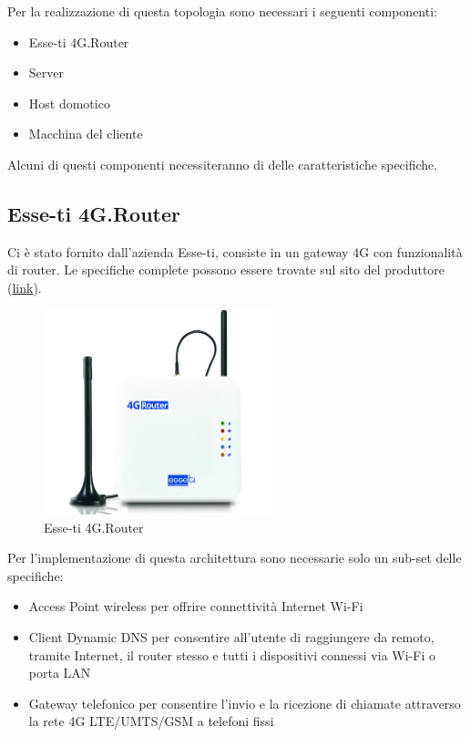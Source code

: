 
Per la realizzazione di questa topologia sono necessari i seguenti componenti:

\begin{itemize}
	\item Esse-ti 4G.Router
	\item Server
	\item Host domotico
	\item Macchina del cliente
\end{itemize}

Alcuni di questi componenti necessiteranno di delle caratteristiche specifiche.

\subsection{Esse-ti 4G.Router}

Ci è stato fornito dall'azienda Esse-ti, consiste in un gateway 4G con funzionalità di router. Le specifiche complete possono essere trovate sul sito del produttore (\href{https://www.esse-ti.it/4g-router}{link}).


\begin{figure}[ht]
	\centering
	\includegraphics[width=250px]{immagini/4grouter.jpg}
	\caption{Esse-ti 4G.Router}
	\label{fig:esse-ti-router-4g}
\end{figure}

Per l'implementazione di questa architettura sono necessarie solo un sub-set delle specifiche:


\begin{itemize}
	\item Access Point wireless per offrire connettività Internet Wi-Fi
 
	\item Client Dynamic DNS per consentire all’utente di raggiungere da remoto, tramite Internet, il router stesso e tutti i dispositivi connessi via Wi-Fi o porta LAN
	
	\item Gateway telefonico per consentire l’invio e la ricezione di chiamate attraverso la rete 4G LTE/UMTS/GSM a telefoni fissi
\end{itemize}

